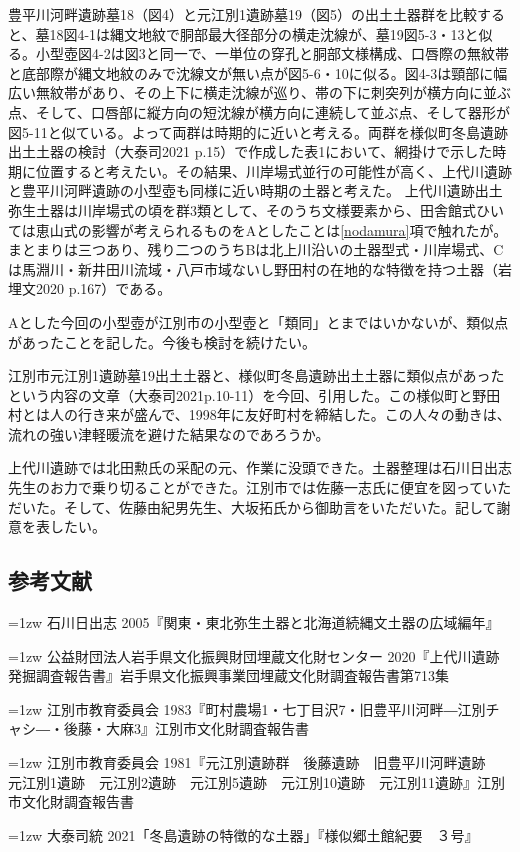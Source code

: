 \documentclass[a4j,11pt,twocolumn,openany]{jsbook}
\begin{document}
豊平川河畔遺跡墓18（図4）と元江別1遺跡墓19（図5）の出土土器群を比較すると、墓18図4-1は縄文地紋で胴部最大径部分の横走沈線が、墓19図5-3・13と似る。小型壺図4-2は図3と同一で、一単位の穿孔と胴部文様構成、口唇際の無紋帯と底部際が縄文地紋のみで沈線文が無い点が図5-6・10に似る。図4-3は頸部に幅広い無紋帯があり、その上下に横走沈線が巡り、帯の下に刺突列が横方向に並ぶ点、そして、口唇部に縦方向の短沈線が横方向に連続して並ぶ点、そして器形が図5-11と似ている。よって両群は時期的に近いと考える。両群を様似町冬島遺跡出土土器の検討（大泰司2021 p.15）で作成した表1において、網掛けで示した時期に位置すると考えたい。その結果、川岸場式並行の可能性が高く、上代川遺跡と豊平川河畔遺跡の小型壺も同様に近い時期の土器と考えた。
上代川遺跡出土弥生土器は川岸場式の頃を群3類として、そのうち文様要素から、田舎館式ひいては恵山式の影響が考えられるものをAとしたことは\ref{nodamura}項で触れたが。まとまりは三つあり、残り二つのうちBは北上川沿いの土器型式・川岸場式、Cは馬淵川・新井田川流域・八戸市域ないし野田村の在地的な特徴を持つ土器（岩埋文2020 p.167）である。

Aとした今回の小型壺が江別市の小型壺と「類同」とまではいかないが、類似点があったことを記した。今後も検討を続けたい。

江別市元江別1遺跡墓19出土土器と、様似町冬島遺跡出土土器に類似点があったという内容の文章（大泰司2021p.10-11）を今回、引用した。この様似町と野田村とは人の行き来が盛んで、1998年に友好町村を締結した。この人々の動きは、流れの強い津軽暖流を避けた結果なのであろうか。

上代川遺跡では北田勲氏の采配の元、作業に没頭できた。土器整理は石川日出志先生のお力で乗り切ることができた。江別市では佐藤一志氏に便宜を図っていただいた。そして、佐藤由紀男先生、大坂拓氏から御助言をいただいた。記して謝意を表したい。
\vspace{1\baselineskip}

\subsection*{参考文献}

{\small
	\hangindent=1zw
	\noindent
	石川日出志 2005『関東・東北弥生土器と北海道続縄文土器の広域編年』
	
	\hangindent=1zw
	\noindent
	公益財団法人岩手県文化振興財団埋蔵文化財センター 2020『上代川遺跡発掘調査報告書』岩手県文化振興事業団埋蔵文化財調査報告書第713集
	
	\hangindent=1zw
	\noindent
	江別市教育委員会 1983『町村農場1・七丁目沢7・旧豊平川河畔―江別チャシ―・後藤・大麻3』江別市文化財調査報告書
	
	\hangindent=1zw
	\noindent
	江別市教育委員会 1981『元江別遺跡群　後藤遺跡　旧豊平川河畔遺跡　元江別1遺跡　元江別2遺跡　元江別5遺跡　元江別10遺跡　元江別11遺跡』江別市文化財調査報告書
	
	\hangindent=1zw
	\noindent
	大泰司統 2021「冬島遺跡の特徴的な土器」『様似郷土館紀要　３号』
	
}
\end{document}
